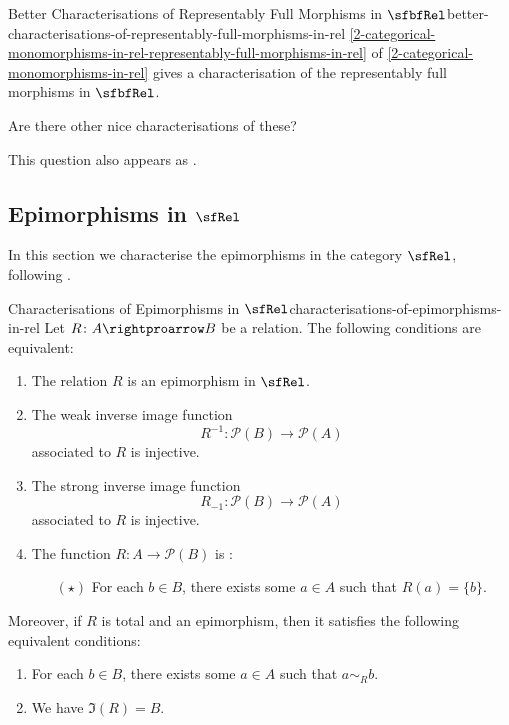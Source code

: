 \begin{question}{Better Characterisations of Representably Full Morphisms in $\sfbfRel$}{better-characterisations-of-representably-full-morphisms-in-rel}%
    \cref{2-categorical-monomorphisms-in-rel-representably-full-morphisms-in-rel} of \cref{2-categorical-monomorphisms-in-rel} gives a characterisation of the representably full morphisms in $\sfbfRel$.

    Are there other nice characterisations of these?

    This question also appears as \cite{MO467527}.
\end{question}
\subsection{Epimorphisms in $\sfRel$}\label{subsection-epimorphisms-in-rel}
In this section we characterise the epimorphisms in the category $\sfRel$, following .
\begin{proposition}{Characterisations of Epimorphisms in $\sfRel$}{characterisations-of-epimorphisms-in-rel}%
    Let $R\colon A\rightproarrow B$ be a relation. The following conditions are equivalent:
    \begin{enumerate}
        \item\label{characterisations-of-epimorphisms-in-rel-1}The relation $R$ is an epimorphism in $\sfRel$.
        \item\label{characterisations-of-epimorphisms-in-rel-2}The weak inverse image function
            \[
                R^{-1}%
                \colon%
                \mathcal{P}(B)%
                \to%
                \mathcal{P}(A)%
            \]%
            associated to $R$ is injective.
        \item\label{characterisations-of-epimorphisms-in-rel-3}The strong inverse image function
            \[
                R_{-1}%
                \colon%
                \mathcal{P}(B)%
                \to%
                \mathcal{P}(A)%
            \]%
            associated to $R$ is injective.
        \item\label{characterisations-of-epimorphisms-in-rel-4}The function $R\colon A\to\mathcal{P}(B)$ is :
            \begin{itemize}
                \item[$(\star)$]For each $b\in B$, there exists some $a\in A$ such that $R(a)=\{b\}$.
            \end{itemize}
    \end{enumerate}
    Moreover, if $R$ is total and an epimorphism, then it satisfies the following equivalent conditions:
    \begin{enumerate}%
        \item For each $b\in B$, there exists some $a\in A$ such that $a\sim_{R}b$.
        \item We have $\Im(R)=B$.
    \end{enumerate}%
\end{proposition}
